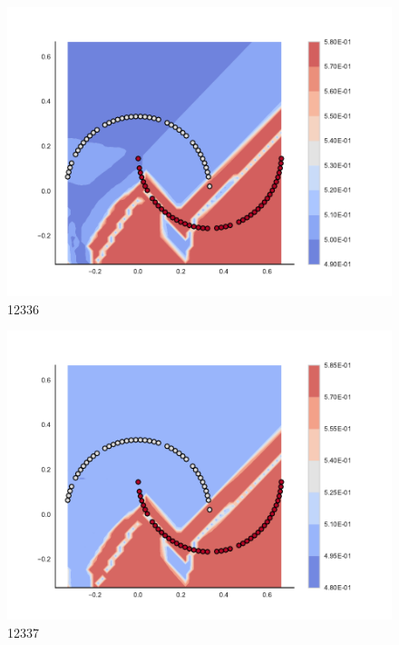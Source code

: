 \begin{subfigure}[b]{0.09\textwidth}
    \includegraphics[clip, trim=2.35cm 1.75cm 4.5cm 0cm,width=\textwidth]{img/convergence/12336.pdf}
    \caption{12336}
    \label{fig:convergence_12336}
\end{subfigure}
%
\begin{subfigure}[b]{0.09\textwidth}
    \includegraphics[clip, trim=2.35cm 1.75cm 4.5cm 0cm,width=\textwidth]{img/convergence/12337.pdf}
    \caption{12337}
    \label{fig:convergence_12337}
\end{subfigure}
%
